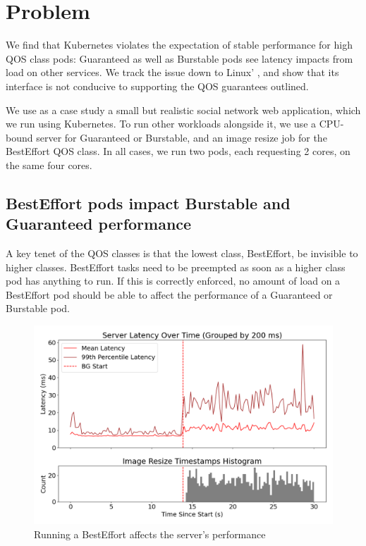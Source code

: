 \section{Problem}\label{s:problem}

We find that Kubernetes violates the expectation of stable performance for high
QOS class pods: Guaranteed as well as Burstable pods see latency impacts from
load on other services. We track the issue down to Linux' \cgroups{}, and show
that its interface is not conducive to supporting the QOS guarantees outlined.

We use as a case study a small but realistic social network web application,
which we run using Kubernetes. To run other workloads alongside it, we use a
CPU-bound server for Guaranteed or Burstable, and an image resize job for the
BestEffort QOS class. In all cases, we run two pods, each requesting 2 cores, on
the same four cores.


\subsection{BestEffort pods impact Burstable and Guaranteed performance}

A key tenet of the QOS classes is that the lowest class, BestEffort, be
invisible to higher classes. BestEffort tasks need to be preempted as soon as a
higher class pod has anything to run. If this is correctly enforced, no amount
of load on a BestEffort pod should be able to affect the performance of a
Guaranteed or Burstable pod.


\begin{figure}[t]
    \centering
    \includegraphics[width=\columnwidth]{graphs/kubernetes-unedited.png}
    \caption{Running a BestEffort affects the server's
    performance}\label{fig:kubernetes-unedited}
\end{figure}

